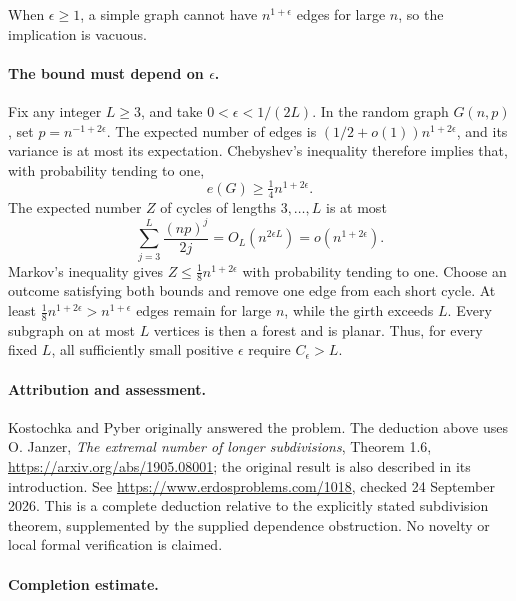 When \(\epsilon\geq1\), a simple graph cannot have \(n^{1+\epsilon}\) edges for large \(n\), so the implication is vacuous.

\paragraph{The bound must depend on \(\epsilon\).}
Fix any integer \(L\geq3\), and take \(0<\epsilon<1/(2L)\). In the random graph \(G(n,p)\), set \(p=n^{-1+2\epsilon}\). The expected number of edges is \((1/2+o(1))n^{1+2\epsilon}\), and its variance is at most its expectation. Chebyshev's inequality therefore implies that, with probability tending to one,
\[
 e(G)\geq\tfrac14n^{1+2\epsilon}.
\]
The expected number \(Z\) of cycles of lengths \(3,\ldots,L\) is at most
\[
 \sum_{j=3}^{L}\frac{(np)^j}{2j}
 =O_L(n^{2\epsilon L})=o(n^{1+2\epsilon}).
\]
Markov's inequality gives \(Z\leq\tfrac18n^{1+2\epsilon}\) with probability tending to one. Choose an outcome satisfying both bounds and remove one edge from each short cycle. At least \(\tfrac18n^{1+2\epsilon}>n^{1+\epsilon}\) edges remain for large \(n\), while the girth exceeds \(L\). Every subgraph on at most \(L\) vertices is then a forest and is planar. Thus, for every fixed \(L\), all sufficiently small positive \(\epsilon\) require \(C_\epsilon>L\).

\paragraph{Attribution and assessment.}
Kostochka and Pyber originally answered the problem. The deduction above uses O. Janzer, \emph{The extremal number of longer subdivisions}, Theorem 1.6, \url{https://arxiv.org/abs/1905.08001}; the original result is also described in its introduction. See \url{https://www.erdosproblems.com/1018}, checked 24 September 2026. This is a complete deduction relative to the explicitly stated subdivision theorem, supplemented by the supplied dependence obstruction. No novelty or local formal verification is claimed.

\paragraph{Completion estimate.}
